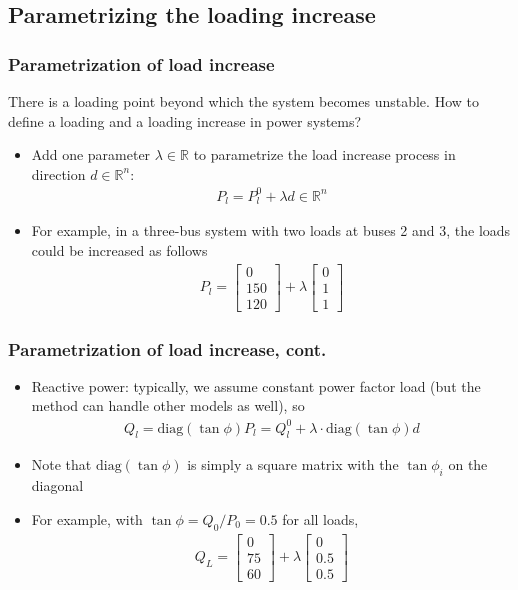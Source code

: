 \documentclass{beamer}
\newcommand*{\field}[1]{\mathbb{#1}}
\newcommand*{\R}{\field{R}} %
\begin{document}
\subsection{Parametrizing the loading increase}
\begin{frame}
  \frametitle{Parametrization of load increase}
There is a \alert{loading} point beyond which the system becomes unstable.
How to define a \alert{loading} and a \alert{loading increase} in power systems?
  \begin{itemize}
  \item Add one parameter $\lambda \in \R$ to parametrize the load increase process in direction $d\in \R^n$:
    \begin{align}
      P_l = P_l^0 + \lambda d \in \R^n
    \end{align}
  \item For example, in a three-bus system with two loads at buses 2 and 3, the loads could be increased as follows
    \begin{align}
      P_l =
      \begin{bmatrix}
        0 \\
        150 \\
        120
      \end{bmatrix} + \lambda
      \begin{bmatrix}
        0 \\
        1\\
        1
      \end{bmatrix}
    \end{align}
  \end{itemize}
\end{frame}

\begin{frame}
  \frametitle{Parametrization of load increase, cont.}
  \begin{itemize}
  \item Reactive power: typically, we assume constant power factor load (but the method can handle other models as well), so
    \begin{align}
      Q_l = \text{diag}(\tan \phi) P_l = Q_l^0 + \lambda \cdot \text{diag}(\tan \phi) d 
    \end{align}
  \item Note that $\text{diag} (\tan \phi)$ is simply a square matrix with the $\tan \phi_i$ on the diagonal
  \item For example, with $\tan \phi = Q_0/P_0 = 0.5$ for all loads, 
    \begin{align}
      Q_L =
      \begin{bmatrix}
        0\\
        75\\
        60
      \end{bmatrix} + \lambda
      \begin{bmatrix}
        0\\
        0.5\\
        0.5
      \end{bmatrix}
    \end{align}
  \end{itemize}
\end{frame}
\end{document}
